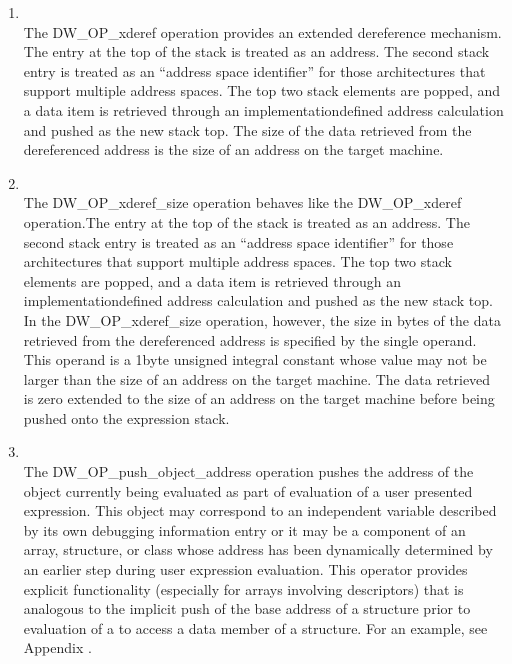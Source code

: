 \begin{enumerate}[1]
\item {} \\
The DW\-\_OP\-\_xderef operation provides an extended dereference
mechanism. The entry at the top of the stack is treated as an
address. The second stack entry is treated as an “address
space identifier” for those architectures that support
multiple address spaces. The top two stack elements are popped,
and a data item is retrieved through an implementation\dash defined
address calculation and pushed as the new stack top. The size
of the data retrieved from the dereferenced address is the
size of an address on the target machine.

\item {}\\
The DW\-\_OP\-\_xderef\-\_size operation behaves like the
DW\-\_OP\-\_xderef operation.The entry at the top of the stack is
treated as an address. The second stack entry is treated as
an “address space identifier” for those architectures
that support multiple address spaces. The top two stack
elements are popped, and a data item is retrieved through an
implementation\dash defined address calculation and pushed as the
new stack top. In the DW\-\_OP\-\_xderef\-\_size operation, however,
the size in bytes of the data retrieved from the dereferenced
address is specified by the single operand. This operand is a
1\dash byte unsigned integral constant whose value may not be larger
than the size of an address on the target machine. The data
retrieved is zero extended to the size of an address on the
target machine before being pushed onto the expression stack.

\item {}\\
The DW\-\_OP\-\_push\-\_object\-\_address operation pushes the address
of the object currently being evaluated as part of evaluation
of a user presented expression. This object may correspond
to an independent variable described by its own debugging
information entry or it may be a component of an array,
structure, or class whose address has been dynamically
determined by an earlier step during user expression
evaluation.  This operator provides explicit functionality
(especially for arrays involving descriptors) that is analogous
to the implicit push of the base address of a structure prior
to evaluation of a  to access a
data member of a structure. For an example, see 
Appendix .


\end{enumerate}

